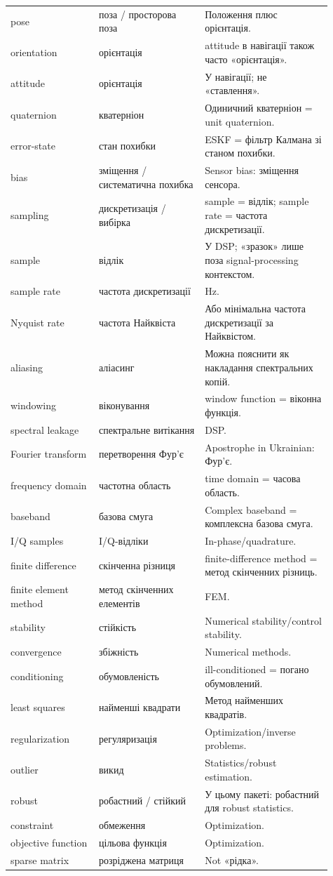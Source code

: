 \begin{longtable}{L{0.25\linewidth}L{0.30\linewidth}L{0.36\linewidth}}
pose & поза / просторова поза & Положення плюс орієнтація.\\
orientation & орієнтація & attitude в навігації також часто «орієнтація».\\
attitude & орієнтація & У навігації; не «ставлення».\\
quaternion & кватерніон & Одиничний кватерніон = unit quaternion.\\
error-state & стан похибки & ESKF = фільтр Калмана зі станом похибки.\\
bias & зміщення / систематична похибка & Sensor bias: зміщення сенсора.\\
sampling & дискретизація / вибірка & sample = відлік; sample rate = частота дискретизації.\\
sample & відлік & У DSP; «зразок» лише поза signal-processing контекстом.\\
sample rate & частота дискретизації & Hz.\\
Nyquist rate & частота Найквіста & Або мінімальна частота дискретизації за Найквістом.\\
aliasing & аліасинг & Можна пояснити як накладання спектральних копій.\\
windowing & віконування & window function = віконна функція.\\
spectral leakage & спектральне витікання & DSP.\\
Fourier transform & перетворення Фур'є & Apostrophe in Ukrainian: Фур'є.\\
frequency domain & частотна область & time domain = часова область.\\
baseband & базова смуга & Complex baseband = комплексна базова смуга.\\
I/Q samples & I/Q-відліки & In-phase/quadrature.\\
finite difference & скінченна різниця & finite-difference method = метод скінченних різниць.\\
finite element method & метод скінченних елементів & FEM.\\
stability & стійкість & Numerical stability/control stability.\\
convergence & збіжність & Numerical methods.\\
conditioning & обумовленість & ill-conditioned = погано обумовлений.\\
least squares & найменші квадрати & Метод найменших квадратів.\\
regularization & регуляризація & Optimization/inverse problems.\\
outlier & викид & Statistics/robust estimation.\\
robust & робастний / стійкий & У цьому пакеті: робастний для robust statistics.\\
constraint & обмеження & Optimization.\\
objective function & цільова функція & Optimization.\\
sparse matrix & розріджена матриця & Not «рідка».\\


\end{longtable}
